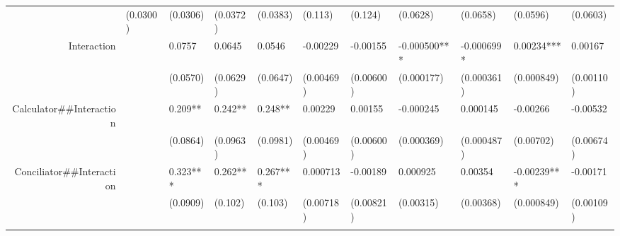 \begin{tabular}{rrrrrrrrrrr}
      & \multicolumn{1}{l}{(0.0300)} & \multicolumn{1}{l}{(0.0306)} & \multicolumn{1}{l}{(0.0372)} & \multicolumn{1}{l}{(0.0383)} & \multicolumn{1}{l}{(0.113)} & \multicolumn{1}{l}{(0.124)} & \multicolumn{1}{l}{(0.0628)} & \multicolumn{1}{l}{(0.0658)} & \multicolumn{1}{l}{(0.0596)} & \multicolumn{1}{l}{(0.0603)} \\
Interaction & \multicolumn{1}{l}{} & \multicolumn{1}{l}{0.0757} & \multicolumn{1}{l}{0.0645} & \multicolumn{1}{l}{0.0546} & \multicolumn{1}{l}{-0.00229} & \multicolumn{1}{l}{-0.00155} & \multicolumn{1}{l}{-0.000500***} & \multicolumn{1}{l}{-0.000699*} & \multicolumn{1}{l}{0.00234***} & \multicolumn{1}{l}{0.00167} \\
      & \multicolumn{1}{l}{} & \multicolumn{1}{l}{(0.0570)} & \multicolumn{1}{l}{(0.0629)} & \multicolumn{1}{l}{(0.0647)} & \multicolumn{1}{l}{(0.00469)} & \multicolumn{1}{l}{(0.00600)} & \multicolumn{1}{l}{(0.000177)} & \multicolumn{1}{l}{(0.000361)} & \multicolumn{1}{l}{(0.000849)} & \multicolumn{1}{l}{(0.00110)} \\
Calculator\#\#Interaction & \multicolumn{1}{l}{} & \multicolumn{1}{l}{0.209**} & \multicolumn{1}{l}{0.242**} & \multicolumn{1}{l}{0.248**} & \multicolumn{1}{l}{0.00229} & \multicolumn{1}{l}{0.00155} & \multicolumn{1}{l}{-0.000245} & \multicolumn{1}{l}{0.000145} & \multicolumn{1}{l}{-0.00266} & \multicolumn{1}{l}{-0.00532} \\
      & \multicolumn{1}{l}{} & \multicolumn{1}{l}{(0.0864)} & \multicolumn{1}{l}{(0.0963)} & \multicolumn{1}{l}{(0.0981)} & \multicolumn{1}{l}{(0.00469)} & \multicolumn{1}{l}{(0.00600)} & \multicolumn{1}{l}{(0.000369)} & \multicolumn{1}{l}{(0.000487)} & \multicolumn{1}{l}{(0.00702)} & \multicolumn{1}{l}{(0.00674)} \\
Conciliator\#\#Interaction & \multicolumn{1}{l}{} & \multicolumn{1}{l}{0.323***} & \multicolumn{1}{l}{0.262**} & \multicolumn{1}{l}{0.267***} & \multicolumn{1}{l}{0.000713} & \multicolumn{1}{l}{-0.00189} & \multicolumn{1}{l}{0.000925} & \multicolumn{1}{l}{0.00354} & \multicolumn{1}{l}{-0.00239***} & \multicolumn{1}{l}{-0.00171} \\
      & \multicolumn{1}{l}{} & \multicolumn{1}{l}{(0.0909)} & \multicolumn{1}{l}{(0.102)} & \multicolumn{1}{l}{(0.103)} & \multicolumn{1}{l}{(0.00718)} & \multicolumn{1}{l}{(0.00821)} & \multicolumn{1}{l}{(0.00315)} & \multicolumn{1}{l}{(0.00368)} & \multicolumn{1}{l}{(0.000849)} & \multicolumn{1}{l}{(0.00109)} \\
      & \multicolumn{1}{l}{} & \multicolumn{1}{l}{} & \multicolumn{1}{l}{} & \multicolumn{1}{l}{} & \multicolumn{1}{l}{} & \multicolumn{1}{l}{} & \multicolumn{1}{l}{} & \multicolumn{1}{l}{} & \multicolumn{1}{l}{} & \multicolumn{1}{l}{} \\

\end{tabular}

